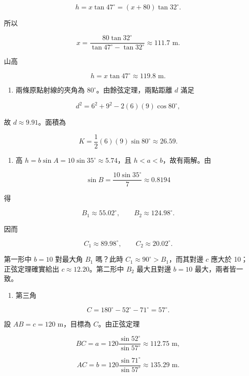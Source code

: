 \documentclass[11pt,a4paper]{article}
\providecommand{\tightlist}{%
  \setlength{\itemsep}{0pt}\setlength{\parskip}{0pt}}
\begin{document}
\[
   h=x\tan47^\circ=(x+80)\tan32^\circ.
   \]

所以

\[
   x=\frac{80\tan32^\circ}{\tan47^\circ-\tan32^\circ}\approx\boxed{111.7\text{ m}}.
   \]

山高

\[
   h=x\tan47^\circ\approx\boxed{119.8\text{ m}}.
   \]

\begin{enumerate}
\def\labelenumi{\arabic{enumi}.}
\setcounter{enumi}{13}
\tightlist
\item
  兩條原點射線的夾角為 \(80^\circ\)。由餘弦定理，兩點距離 \(d\) 滿足
\end{enumerate}

\[
   d^2=6^2+9^2-2(6)(9)\cos80^\circ,
   \]

故 \(d\approx\boxed{9.91}\)。面積為

\[
   K=\frac12(6)(9)\sin80^\circ\approx\boxed{26.59}.
   \]

\begin{enumerate}
\def\labelenumi{\arabic{enumi}.}
\setcounter{enumi}{14}
\tightlist
\item
  高 \(h=b\sin A=10\sin35^\circ\approx5.74\)，且 \(h<a<b\)，故有兩解。由
\end{enumerate}

\[
   \sin B=\frac{10\sin35^\circ}{7}\approx0.8194
   \]

得

\[
   B_1\approx55.02^\circ,\qquad B_2\approx124.98^\circ.
   \]

因而

\[
   C_1\approx89.98^\circ,\qquad C_2\approx20.02^\circ.
   \]

第一形中 \(b=10\) 對最大角 \(B_1\) 嗎？此時 \(C_1\approx90^\circ>B_1\)，而其對邊 \(c\) 應大於 10；正弦定理確實給出 \(c\approx12.20\)。第二形中 \(B_2\) 最大且對邊 \(b=10\) 最大，兩者皆一致。

\begin{enumerate}
\def\labelenumi{\arabic{enumi}.}
\setcounter{enumi}{15}
\tightlist
\item
  第三角
\end{enumerate}

\[
   C=180^\circ-52^\circ-71^\circ=57^\circ.
   \]

設 \(AB=c=120\) m，目標為 \(C\)。由正弦定理

\[
   BC=a=120\frac{\sin52^\circ}{\sin57^\circ}\approx\boxed{112.75\text{ m}},
   \]

\[
   AC=b=120\frac{\sin71^\circ}{\sin57^\circ}\approx\boxed{135.29\text{ m}}.
   \]
\end{document}

